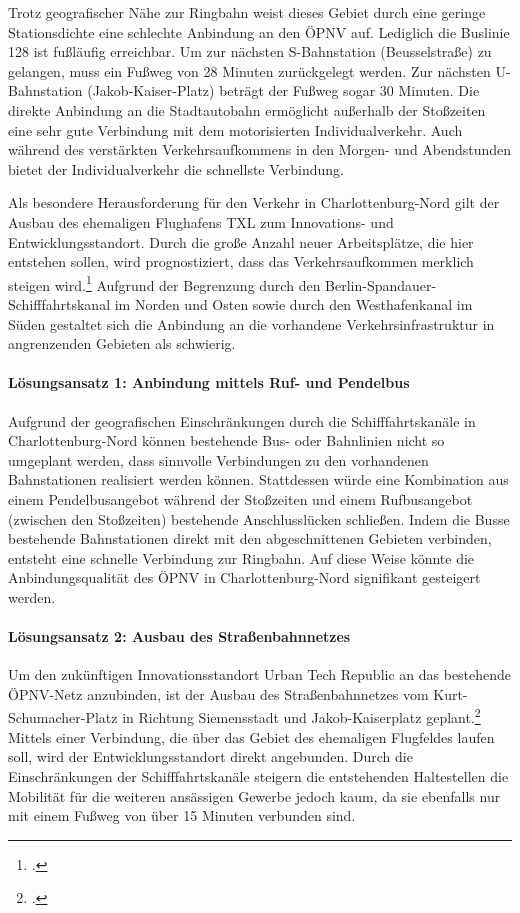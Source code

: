 Trotz geografischer Nähe zur Ringbahn weist dieses Gebiet durch eine geringe Stationsdichte eine schlechte Anbindung an den ÖPNV auf. Lediglich die Buslinie 128 ist fußläufig erreichbar. Um zur nächsten S-Bahnstation (Beusselstraße) zu gelangen, muss ein Fußweg von 28 Minuten zurückgelegt werden. Zur nächsten U-Bahnstation (Jakob-Kaiser-Platz) beträgt der Fußweg sogar 30 Minuten. Die direkte Anbindung an die Stadtautobahn ermöglicht außerhalb der Stoßzeiten eine sehr gute Verbindung mit dem motorisierten Individualverkehr. Auch während des verstärkten Verkehrsaufkommens in den Morgen- und Abendstunden bietet der Individualverkehr die schnellste Verbindung.


Als besondere Herausforderung für den Verkehr in Charlottenburg-Nord gilt der Ausbau des ehemaligen Flughafens TXL zum Innovations- und Entwicklungsstandort. Durch die große Anzahl neuer Arbeitsplätze, die hier entstehen sollen, wird prognostiziert, dass das Verkehrsaufkommen merklich steigen wird.\footcite{UrbanTechRepublic} Aufgrund der Begrenzung durch den Berlin-Spandauer-Schifffahrtskanal im Norden und Osten sowie durch den Westhafenkanal im Süden gestaltet sich die Anbindung an die vorhandene Verkehrsinfrastruktur in angrenzenden Gebieten als schwierig.

\paragraph{Lösungsansatz 1: Anbindung mittels Ruf- und Pendelbus}
Aufgrund der geografischen Einschränkungen durch die Schifffahrtskanäle in Charlottenburg-Nord können bestehende Bus- oder Bahnlinien nicht so umgeplant werden, dass sinnvolle Verbindungen zu den vorhandenen Bahnstationen realisiert werden können. Stattdessen würde eine Kombination aus einem Pendelbusangebot während der Stoßzeiten und einem Rufbusangebot (zwischen den Stoßzeiten) bestehende Anschlusslücken schließen. Indem die Busse bestehende Bahnstationen direkt mit den abgeschnittenen Gebieten verbinden, entsteht eine schnelle Verbindung zur Ringbahn. Auf diese Weise könnte die Anbindungsqualität des ÖPNV in Charlottenburg-Nord signifikant gesteigert werden.

\paragraph{Lösungsansatz 2: Ausbau des Straßenbahnnetzes}
Um den zukünftigen Innovationsstandort Urban Tech Republic an das bestehende ÖPNV-Netz anzubinden, ist der Ausbau des Straßenbahnnetzes vom Kurt-Schumacher-Platz in Richtung Siemensstadt und Jakob-Kaiserplatz geplant.\footcite{NahverkehrsplanBerlin} Mittels einer Verbindung, die über das Gebiet des ehemaligen Flugfeldes laufen soll, wird der Entwicklungsstandort direkt angebunden. Durch die Einschränkungen der Schifffahrtskanäle steigern die entstehenden Haltestellen die Mobilität für die weiteren ansässigen Gewerbe jedoch kaum, da sie ebenfalls nur mit einem Fußweg von über 15 Minuten verbunden sind.

